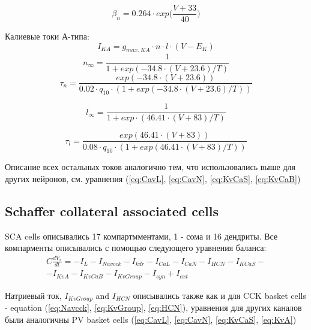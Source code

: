 \documentclass[12pt]{article}
\begin{document}
\begin{equation}
\beta_n = 0.264 \cdot exp \Big( \frac{V + 33}{40} \Big)
\end{equation}

Калиевые токи А-типа:
\begin{equation}
I_{KA} = g_{max, KA} \cdot n \cdot l \cdot (V - E_K)
\end{equation}
\begin{equation}
n_{\infty} = \frac{1}{1 + exp(-34.8 \cdot (V + 23.6)/T)}
\end{equation}
\begin{equation}
\tau_n = \frac{exp(-34.8 \cdot (V + 23.6)) }
{0.02 \cdot q_{10} \cdot (1 + exp(-34.8 \cdot (V + 23.6)/T))}
\end{equation}

\begin{equation}
l_{\infty} = \frac{1}{1 + exp \cdot (46.41\cdot (V + 83)/T)}
\end{equation}

\begin{equation}
\tau_l = \frac{exp(46.41\cdot (V + 83)) }
{0.08 \cdot q_{10} \cdot (1 + exp(46.41\cdot (V + 83)/T))}
\end{equation}

Описание всех остальных токов аналогично тем, что использовались выше для других нейронов, см. уравнения (\ref{eq:CavL}, \ref{eq:CavN}, \ref{eq:KvCaS}, \ref{eq:KvCaB})

\subsection{Schaffer collateral associated cells}
SCA cells описывались 17 компартмментами, 1 - сома и 16 дендриты. Все компарменты описывались с помощью следующего уравнения баланса:
\begin{eqnarray}
C\frac{dV_s}{dt}=-I_L-I_{Navcck}-I_{kdr}-I_{CaL}-I_{CaN}-I_{HCN}-I_{KCaS}- \nonumber \\ -I_{KvA}-I_{KvCaB}-I_{KvGroup}-I_{syn} + I_{ext}
\end{eqnarray}

Натриевый ток, $I_{KvGroup}$ and $I_{HCN}$ описывались также как и для CCK basket cells - equation  (\ref{eq:Navcck}, \ref{eq:KvGroup}, \ref{eq:HCN}), уравнения для других каналов были аналогичны PV basket cells  (\ref{eq:CavL}, \ref{eq:CavN}, \ref{eq:KvCaS}, \ref{eq:KvA})
\end{document}
